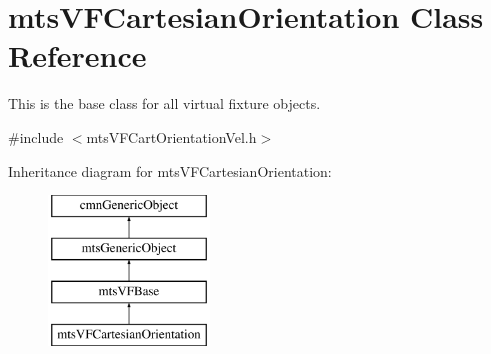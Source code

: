 \hypertarget{classmts_v_f_cartesian_orientation}{\section{mts\-V\-F\-Cartesian\-Orientation Class Reference}
\label{classmts_v_f_cartesian_orientation}
}


This is the base class for all virtual fixture objects.  




{\ttfamily \#include $<$mts\-V\-F\-Cart\-Orientation\-Vel.\-h$>$}

Inheritance diagram for mts\-V\-F\-Cartesian\-Orientation\-:\begin{figure}[H]
\begin{center}
\leavevmode
\includegraphics[height=4.000000cm]{de/d66/classmts_v_f_cartesian_orientation}
\end{center}
\end{figure}
